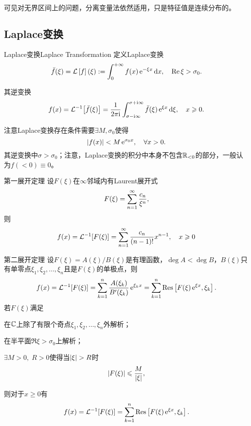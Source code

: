 可见对无界区间上的问题，分离变量法依然适用，只是特征值是连续分布的。
\subsection{Laplace变换}
\begin{definition}{Laplace变换}{Laplace Transformation}
	定义Laplace变换
	\[\bar f(\xi)=\cl f(\xi):=\int\zti f(x)\e{-\xi x}\d x,\quad\Re\xi>\sigma_0.\]
	
	其逆变换
	\[f(x)=\cli{\bar f(\xi)}=\frac1{2\pi\i}\int_{\sigma-\i\infty}^{\sigma+\i\infty}\bar f(\xi)\e{\xi x}\d\xi,\quad x\geqslant 0.\]
\end{definition}
注意Laplace变换存在条件需要$\exists M,\sigma_0$使得
	\[\abs{f(x)}<M\e{\sigma_0x},\quad\forall x>0.\]
其逆变换中$\sigma>\sigma_0$；注意，Laplace变换的积分中本身不包含$\RR_{<0}$的部分，一般认为$f(<0)\equiv 0$。
\begin{theorem}{第一展开定理}{}
	设$F(\xi)$在$\infty$邻域内有Laurent展开式
	\[F(\xi)=\sum\fmto n1\frac{c_n}{\xi^n},\]
	则
	\[f(x)=\cli{F(\xi)}=\sum\fmto n1\frac{c_n}{(n-1)!}x^{n-1},\quad x\geqslant 0\]
\end{theorem}
\begin{theorem}{第二展开定理}{}
	设$F(\xi)=A(\xi)/B(\xi)$是有理函数，$\deg A<\deg B$，$B(\xi)$只有单零点$\xi_1,\xi_2,\ldots,\xi_n$且是$F(\xi)$的单极点，则
	\[f(x)=\cli{F(\xi)}=\sum\fmto[n]k1\frac{A(\xi_k)}{B'(\xi_k)}\e{\xi_kx}=\sum\fmto[n]k1\Res\fkh{F(\xi)\e{\xi x},\xi_k}.\]
\tcblower
	若$F(\xi)$满足
	\begin{compactenum}
		\item 在$\CC$上除了有限个奇点$\xi_1,\xi_2,\ldots,\xi_n$外解析；
		\item 在半平面$\Re\xi>\sigma_0$上解析；
		\item $\exists M>0,\;R>0$使得当$\abs\xi>R$时
		\[\abs{F(\xi)}\leqslant\frac M{\abs\xi},\]
	\end{compactenum}
	则对于$x\geqslant 0$有
	\[f(x)=\cli{F(\xi)}=\sum\fmto[n]k1\Res\fkh{F(\xi)\e{\xi x},\xi_k}.\]
\end{theorem}
